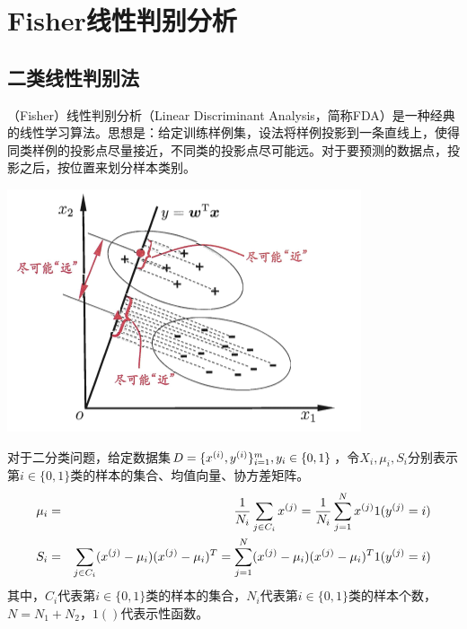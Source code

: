 \section{Fisher线性判别分析}
\subsection{二类线性判别法}
（Fisher）线性判别分析（Linear Discriminant Analysis，简称FDA）是一种经典的线性学习算法。思想是：给定训练样例集，设法将样例投影到一条直线上，使得同类样例的投影点尽量接近，不同类的投影点尽可能远。对于要预测的数据点，投影之后，按位置来划分样本类别。
\begin{center}
\includegraphics[scale=1]{../figures/LDA1.PNG} 
\end{center}
对于二分类问题，给定数据集$D=\{{x}^{({i})},{y}^{({i})}\}^m_{i=1},y_i\in \{0,1\}$，令$X_i,\mu_i,S_i$分别表示第$i\in\{0,1\}$类的样本的集合、均值向量、协方差矩阵。
\begin{eqnarray}
\mu_i &=& \frac{1}{N_i}\sum_{j\in C_i}{x}^{({j})} = \frac{1}{N_i}\sum_{j=1}^N {x}^{({j})}1({y}^{({j})}=i)\\
S_i &=& \sum_{j\in C_i}({x}^{({j})}-\mu_i)({x}^{({j})}-\mu_i)^T = \sum_{j=1}^N ({x}^{({j})}-\mu_i)({x}^{({j})}-\mu_i)^T1({y}^{({j})}=i)
\end{eqnarray}
其中，$C_i$代表第$i\in\{0,1\}$类的样本的集合，$N_i$代表第$i\in\{0,1\}$类的样本个数，$N=N_1+N_2$，$1()$代表示性函数。

